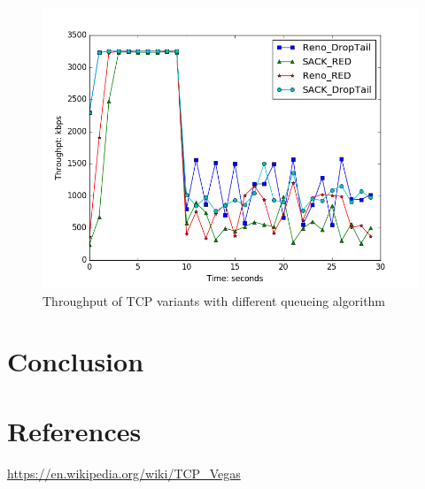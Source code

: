 \documentclass[10pt, conference]{IEEEtran/IEEEtran}
\begin{document}
\begin{figure}[htbp]
\begin{center}
\includegraphics[width=\linewidth]{../exp3/exp3_thpt.png}
\caption{Throughput of TCP variants with different queueing algorithm}
\label{exp1_thpt}
\end{center}
\end{figure}
\section{Conclusion}

\section{References}
\url{https://en.wikipedia.org/wiki/TCP_Vegas}
\end{document}
